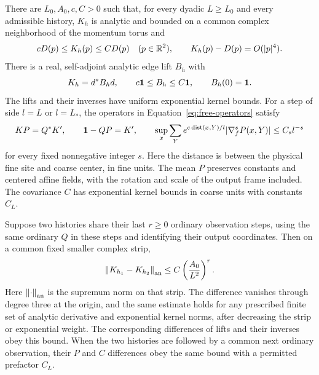 \begin{proposition}
\label{prop:free-bounds}
There are $L_0,A_0,c,C>0$ such that, for every dyadic $L\ge L_0$ and
every admissible history, $K_{h}$ is analytic and bounded on a
common complex neighborhood of the momentum torus and
\[
 cD(p)\le K_{h}(p)\le CD(p)\quad(p\in\mathbb R^2),
 \qquad K_{h}(p)-D(p)=O(|p|^4).
\]
There is a real, self-adjoint analytic edge lift $B_{h}$ with
\[
 K_{h}=d^*B_{h}d,
 \qquad c\mathbf 1\le B_{h}\le C\mathbf 1,
 \qquad B_{h}(0)=\mathbf 1.
\]
The lifts and their inverses have uniform exponential kernel bounds.
For a step of side $l=L$ or $l=L_*$, the operators in
Equation~\eqref{eq:free-operators} satisfy
\[
 KP=Q^*K',\qquad \mathbf 1-QP=K',
 \qquad
 \sup_x\sum_Y e^{c\operatorname{dist}(x,Y)/l}
       |\nabla_f^sP(x,Y)|\le C_s l^{-s}
\]
for every fixed nonnegative integer $s$.  Here the distance is between
the physical fine site and coarse center, in fine units.
The mean $P$ preserves constants and centered affine fields, with the
rotation and scale of the output frame included.  The covariance $C$
has exponential kernel bounds in coarse units with constants $C_L$.

Suppose two histories share their last $r\ge0$ ordinary observation
steps, using the same ordinary $Q$ in these steps and identifying their
output coordinates.  Then on a common fixed smaller complex strip,
\begin{equation}
 \left\lVert K_{h_1}-K_{h_2}\right\rVert_{\rm an}
 \le C\left(\frac{A_0}{L^2}\right)^r.
 \label{eq:free-history}
\end{equation}
Here $\left\lVert\cdot\right\rVert_{\rm an}$ is the supremum norm on that strip.
The difference vanishes through degree three at the origin, and the
same estimate holds for any prescribed finite set of analytic derivative
and exponential kernel norms, after decreasing the strip or exponential
weight.  The corresponding differences of lifts and their inverses
obey this bound.  When the two histories are followed by a common next
ordinary observation, their $P$ and $C$ differences obey the same bound
with a permitted prefactor $C_L$.
\end{proposition}

